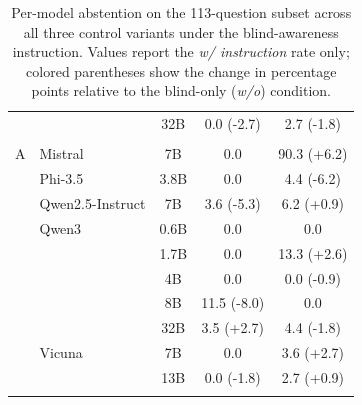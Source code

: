 \begin{table}[t]
{\begin{tabular}{llc|cc}
 &  & 32B & 0.0 \textcolor{[HTML]{CC7A00}}{(-2.7)} & 2.7 \textcolor{[HTML]{CC7A00}}{(-1.8)} \\
\addlinespace[1pt]
\multicolumn{5}{l}{Standalone LLMs} \\
A & Mistral & 7B & 0.0 & 90.3 \textcolor{[HTML]{0072B2}}{(+6.2)} \\
 & Phi-3.5 & 3.8B & 0.0 & 4.4 \textcolor{[HTML]{CC7A00}}{(-6.2)} \\
 & Qwen2.5-Instruct & 7B & 3.6 \textcolor{[HTML]{CC7A00}}{(-5.3)} & 6.2 \textcolor{[HTML]{0072B2}}{(+0.9)} \\
 & Qwen3 & 0.6B & 0.0 & 0.0 \\
 &  & 1.7B & 0.0 & 13.3 \textcolor{[HTML]{0072B2}}{(+2.6)} \\
 &  & 4B & 0.0 & 0.0 \textcolor{[HTML]{CC7A00}}{(-0.9)} \\
 &  & 8B & 11.5 \textcolor{[HTML]{CC7A00}}{(-8.0)} & 0.0 \\
 &  & 32B & 3.5 \textcolor{[HTML]{0072B2}}{(+2.7)} & 4.4 \textcolor{[HTML]{CC7A00}}{(-1.8)} \\
 & Vicuna & 7B & 0.0 & 3.6 \textcolor{[HTML]{0072B2}}{(+2.7)} \\
 &  & 13B & 0.0 \textcolor{[HTML]{CC7A00}}{(-1.8)} & 2.7 \textcolor{[HTML]{0072B2}}{(+0.9)} \\
\addlinespace[1pt]
\bottomrule
\end{tabular}
}
\caption{\small Per-model abstention on the 113-question subset across all three control variants under the blind-awareness instruction. Values report the \textit{w/ instruction} rate only; colored parentheses show the change in percentage points relative to the blind-only (\textit{w/o}) condition.}
\label{tab:abstention_inst_effect_vABC_q113}
\end{table}
